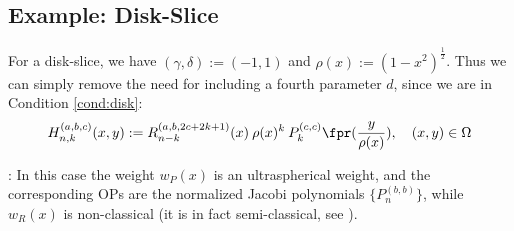 \documentclass{imposter}
\newcommand{\half}{\frac{1}{2}}
\newcommand{\hdop}{H}
\newcommand{\jac}{{P}}
\newcommand{\genjac}{R}
\newcommand{\genjacnmk}{\genjac_{n-k}}
\newcommand{\genjacw}{w_\genjac}
\newcommand{\jacw}{w_P}
\newcommand{\hdopnkabc}{\hdop_{n,k}^{(a,b,c)}}
\begin{document}
{\subsection{Example: Disk-Slice}
	
For a disk-slice, we have $(\gamma,\delta) := (-1,1)$ and $\rho(x) := (1-x^2)^{\half}$. Thus we can simply remove the need for including a fourth parameter $d$, since we are in Condition \ref{cond:disk}:
\begin{align*}\label{eq:diskpolys}
	\hdopnkabc(x,y) := \genjacnmk^{(a, b, 2c+2k+1)}(x) \: \rho(x)^k \: \jac_k^{(c,c)}\fpr(\frac{y}{\rho(x)}), \quad (x,y) \in \Omega
\end{align*}

: In this case the weight $\jacw(x)$ is an ultraspherical weight, and the corresponding OPs are the normalized Jacobi polynomials $\{\jac_n^{(b, b)}\}$, while $\genjacw(x)$ is non-classical (it is in fact semi-classical, see \cite[\S5]{magnus1995painleve}).

    }	
    
\end{document}
